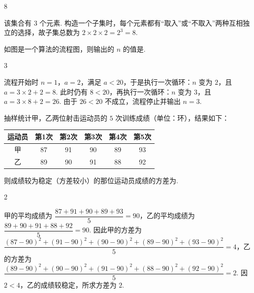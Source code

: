 \begin{answer}
8
\end{answer}

\begin{solution}
该集合有 \(3\) 个元素. 构造一个子集时，每个元素都有“取入”或“不取入”两种互相独立的选择，故子集总数为
\(2\times2\times2=2^3=8\).
\end{solution}

\begin{problem}
如图是一个算法的流程图，则输出的 \(n\) 的值是\fillinblank{}.

\end{problem}

\begin{answer}
3
\end{answer}

\begin{solution}
流程开始时 \(n=1\)，\(a=2\)，满足 \(a<20\)，于是执行一次循环：\(n\) 变为 \(2\)，且 \(a=3\times2+2=8\). 此时仍有 \(8<20\)，再执行一次循环：\(n\) 变为 \(3\)，且 \(a=3\times8+2=26\). 由于 \(26<20\) 不成立，流程停止并输出 \(n=3\).
\end{solution}

\begin{problem}
抽样统计甲，乙两位射击运动员的 \(5\) 次训练成绩（单位：环），结果如下：

\begin{center}
{\renewcommand{\arraystretch}{1.15}
\begin{tabular}{|c|c|c|c|c|c|}
\hline
运动员 & 第1次 & 第2次 & 第3次 & 第4次 & 第5次 \\
\hline
甲 & 87 & 91 & 90 & 89 & 93 \\
\hline
乙 & 89 & 90 & 91 & 88 & 92 \\
\hline
\end{tabular}}
\end{center}

则成绩较为稳定（方差较小）的那位运动员成绩的方差为\fillinblank{}.
\end{problem}

\begin{answer}
2
\end{answer}

\begin{solution}
甲的平均成绩为 \(\dfrac{87+91+90+89+93}{5}=90\)，乙的平均成绩为 \(\dfrac{89+90+91+88+92}{5}=90\). 因此甲的方差为
\(\dfrac{(87-90)^2+(91-90)^2+(90-90)^2+(89-90)^2+(93-90)^2}{5}=4\)，乙的方差为
\(\dfrac{(89-90)^2+(90-90)^2+(91-90)^2+(88-90)^2+(92-90)^2}{5}=2\). 因 \(2<4\)，乙的成绩较稳定，所求方差为 \(2\).
\end{solution}

